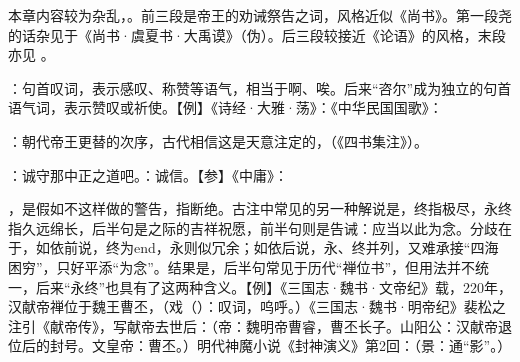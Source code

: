 {
本章内容较为杂乱，。前三段是帝王的劝诫祭告之词，风格近似《尚书》。第一段尧的话杂见于《尚书·虞夏书·大禹谟》（伪）。后三段较接近《论语》的风格，末段亦见 。 %
\begin{lyitemize}
\item {}：句首叹词，表示感叹、称赞等语气，相当于啊、唉。后来“咨尔”成为独立的句首语气词，表示赞叹或祈使。【例】《诗经·大雅·荡》：《中华民国国歌》：
\item {}：朝代帝王更替的次序，古代相信这是天意注定的，（《四书集注》）。%
\item {}：诚守那中正之道吧。：诚信。【参】《中庸》：

，是假如不这样做的警告，指断绝。古注中常见的另一种解说是，终指极尽，永终指久远绵长，后半句是之际的吉祥祝愿，前半句则是告诫：应当以此为念。分歧在于，如依前说，终为end，永则似冗余；如依后说，永、终并列，又难承接“四海困穷”，只好平添“为念”。结果是，后半句常见于历代“禅位书”，但用法并不统一，后来“永终”也具有了这两种含义。【例】《三国志·魏书·文帝纪》载，220年，汉献帝禅位于魏王曹丕，（戏（）：叹词，呜呼。）《三国志·魏书·明帝纪》裴松之注引《献帝传》，写献帝去世后：（帝：魏明帝曹睿，曹丕长子。山阳公：汉献帝退位后的封号。文皇帝：曹丕。）明代神魔小说《封神演义》第2回：（景：通“影”。）


\end{lyitemize}}
